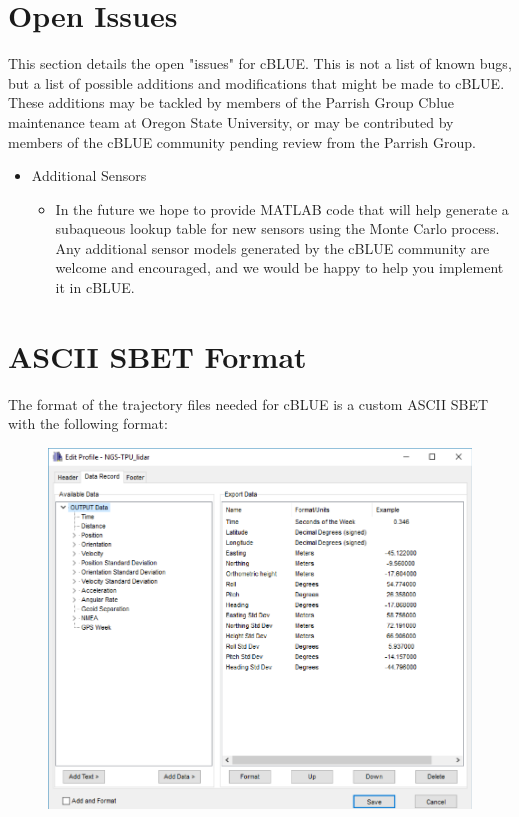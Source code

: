 \documentclass[11pt, a4paper]{article}
\begin{document}
\section{Open Issues}       
\label{sec:issues}   
\vspace{-.1cm}
This section details the open "issues" for cBLUE. This is not a list of known bugs, but a list of possible additions and modifications that might be made to cBLUE. These additions may be tackled by members of the Parrish Group Cblue maintenance team at Oregon State University, or may be contributed by members of the cBLUE community pending review from the Parrish Group.

\begin{itemize}
    \item Additional Sensors
    \begin{itemize}
        \item In the future we hope to provide MATLAB code that will help generate a subaqueous lookup table for new sensors using the Monte Carlo process. Any additional sensor models generated by the cBLUE community are welcome and encouraged, and we would be happy to help you implement it in cBLUE. 
    \end{itemize}
\end{itemize}
\break
\appendix
\section{ASCII SBET Format}
\label{appendix:SBET}
The format of the trajectory files needed for cBLUE is a custom ASCII SBET with the following format:
\begin{figure}[H]
    \centering
    \includegraphics[width=15cm]{figs/SBET_format.png}
\end{figure}


\nocite{*}

\end{document}
